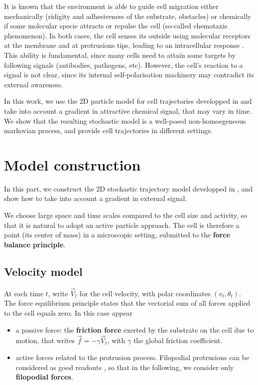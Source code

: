 \documentclass[a4paper,11pt]{article}
\newcommand{\itemr}{\item[$\rightarrow$]}
\begin{document}
It is known that the environment is able to guide cell migration either mechanically (ridigity and adhesiveness of the substrate, obstacles) or chemically if some molecular specie attracts or repulse the cell (so-called chemotaxis phenomenon). In both cases, the cell senses its outside using molecular receptors at the membrane and at protrusions tips, leading to an intracellular response \citep{heckman2013filopodia,Lidke2005Reaching-out-fo}. This ability is fundamental, since many cells need to attain some targets by following signals (antibodies, pathogens, etc). However, the cell's reaction to a signal is not clear, since its internal self-polarisation machinery may contradict its external awareness. \par 
In this work, we use the 2D particle model for cell trajectories developped in \citep{etchegaray:tel-01533458} and take into account a gradient in attractive chemical signal, that may vary in time.
We show that the resulting stochastic model is a well-posed non-homoegeneous markovian process, and provide cell trajectories in different settings. 


	\section{Model construction}
In this part, we construct the 2D stochastic trajectory model developped in \citep{etchegaray:tel-01533458}, and show how to take into account a gradient in external signal. 	
	
We choose large space and time scales compared to the cell size and activity, so that it is natural to adopt an active particle approach. The cell is therefore a point (its center of mass) in a microscopic setting, submitted to the \textbf{force balance principle}. 

\subsection{Velocity model}
At each time $t$, write $\vec{V}_{t}$ for the cell velocity, with polar coordinates $(v_{t},\theta_{t})$. The force equilibrium principle states that the vectorial sum of all forces applied to the cell equals zero. In this case appear
\begin{itemize}
\itemr a passive force: the \textbf{friction force} exerted by the substrate on the cell due to motion, that writes $\vec{f} = -\gamma \vec{V}_t$, with $\gamma$ the global friction coefficient.
\itemr active forces related to the protrusion process. Filopodial protrusions can be considered as good readouts  \citep{Caballero2014Protrusion-fluc}, so that in the following, we consider only \textbf{filopodial forces}.
\end{itemize}
\end{document}
